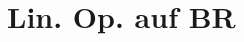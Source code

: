 \documentclass[a7paper,11pt,print,grid=front]{kartei}
\begin{document}
	\section*{Lin. Op. auf BR}
		
		
	
		
\end{document}
